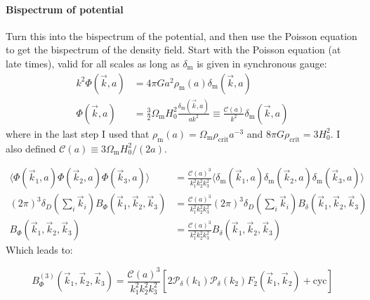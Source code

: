         \paragraph{Bispectrum of potential}
            Turn this into the bispectrum of the potential, and then use the Poisson equation to get the bispectrum of the density field. Start with the Poisson equation (at late times), valid for all scales as long as $\delta_\mathrm{m}$ is given in synchronous gauge:
            \begin{equation}
                \begin{split}
                    k^2\Phi(\vec{k},a) &= 4\pi G a^2 \rho_\mathrm{m}(a) \delta_\mathrm{m}(\vec{k},a)\\
                    \Phi(\vec{k}, a) &= \frac{3}{2}\Omega_\mathrm{m} H_0^2 \frac{\delta_\mathrm{m}(\vec{k},a)}{ak^2} \equiv \frac{\mathcal{C}(a)}{k^2}\delta_\mathrm{m}(\vec{k},a)
                \end{split}
            \end{equation}
            where in the last step I used that $\rho_\mathrm{m}(a) = \Omega_\mathrm{m} \rho_\mathrm{crit} a^{-3}$ and $8\pi G \rho_\mathrm{crit} = 3H_0^2$. I also defined $\mathcal{C}(a) \equiv 3\Omega_\mathrm{m}H_0^2/(2a)$. 

            \begin{equation}
                \begin{split}
                    \langle \Phi(\vec{k}_1,a) \Phi(\vec{k}_2,a) \Phi(\vec{k}_3,a) \rangle &= \frac{\mathcal{C}(a)^3}{k_1^2k_2^2k_3^2} \langle \delta_\mathrm{m}(\vec{k}_1,a) \delta_\mathrm{m}(\vec{k}_2,a) \delta_\mathrm{m}(\vec{k}_3,a) \rangle\\
                    (2\pi)^3 \delta_D\left(\sum_i\vec{k}_i\right) B_\Phi(\vec{k}_1,\vec{k}_2,\vec{k}_3)&= \frac{\mathcal{C}(a)^3}{k_1^2k_2^2k_3^2} (2\pi)^3 \delta_D\left(\sum_i\vec{k}_i\right) B_\delta(\vec{k}_1,\vec{k}_2,\vec{k}_3)\\
                    B_\Phi(\vec{k}_1,\vec{k}_2,\vec{k}_3) &= \frac{\mathcal{C}(a)^3}{k_1^2k_2^2k_3^2} B_\delta(\vec{k}_1,\vec{k}_2,\vec{k}_3)
                \end{split}
            \end{equation}
            Which leads to:

            \begin{equation}
                B^{(3)}_\Phi(\vec{k}_1,\vec{k}_2,\vec{k}_3) = \frac{\mathcal{C}(a)^3}{k_1^2k_2^2k_3^2} \left[2\mathcal{P}_\delta(k_1)\mathcal{P}_\delta(k_2)F_2(\vec{k}_1, \vec{k}_2) + \mathrm{cyc}\right]
            \end{equation}

